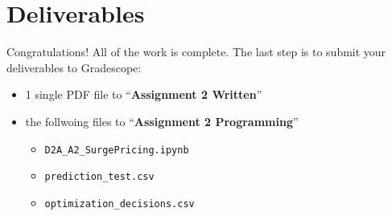 \documentclass[11pt, letter, answers]{exam}
\begin{document}
\vspace{1em}
\section*{Deliverables}
Congratulations! All of the work is complete. The last step is to submit your deliverables to Gradescope:

\begin{itemize}
    \item 1 single PDF file to ``\textbf{Assignment 2 Written}''
    \item the follwoing files to ``\textbf{Assignment 2 Programming}''
    \begin{itemize}
        \item \texttt{D2A\_A2\_SurgePricing.ipynb}
        \item \texttt{prediction\_test.csv}
        \item \texttt{optimization\_decisions.csv}
    \end{itemize}
\end{itemize}
\end{document}

